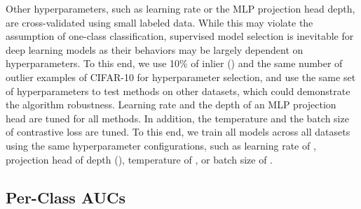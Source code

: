 \documentclass{article} \usepackage{iclr2021_conference,times}
\begin{document}
Other hyperparameters, such as learning rate or the MLP projection head depth, are cross-validated using small labeled data.
While this may violate the assumption of one-class classification, supervised model selection is inevitable for deep learning models as their behaviors may be largely dependent on hyperparameters.
To this end, we use 10\% of inlier () and the same number of outlier examples of CIFAR-10 for hyperparameter selection, and use the same set of hyperparameters to test methods on other datasets, which could demonstrate the algorithm robustness. 
Learning rate  and the depth  of an MLP projection head are tuned for all methods. In addition, the temperature  and the batch size  of contrastive loss are tuned.
To this end, we train all models across all datasets using the same hyperparameter configurations, such as learning rate of , projection head of depth  (), temperature  of , or batch size of . 

\subsection{Per-Class AUCs}
\label{sec:supp_per_class_aucs}
\end{document}
